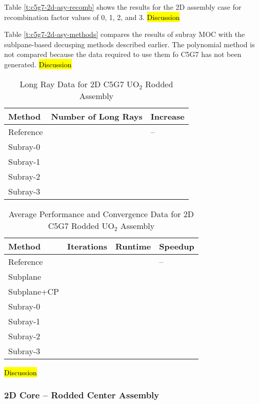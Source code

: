 Table \ref{t:c5g7-2d-asy-recomb} shows the results for the 2D assembly case for recombination factor values of 0, 1, 2, and 3. \hl{Discussion}

Table \ref{t:c5g7-2d-asy-methods} compares the results of subray MOC with the sublpane-based decusping methods described earlier.  The polynomial method is not compared because the data required to use them fo C5G7 has not been generated. \hl{Discussion}

\begin{table}[h]
    \centering
    \caption{Long Ray Data for 2D C5G7 UO\texorpdfstring{$_2$}{2} Rodded Assembly}\label{t:subray-data-2dassembly}
    \begin{tabular}{l l l}\toprule
        Method & Number of Long Rays & Increase \\\midrule
        Reference &  & -- \\
        Subray-0 &  &  \\
        Subray-1 &  &  \\
        Subray-2 &  &  \\
        Subray-3 &  &  \\
        \bottomrule
    \end{tabular}
\end{table}

\begin{table}[h]
    \centering
    \caption{Average Performance and Convergence Data for 2D C5G7 Rodded UO\texorpdfstring{$_2$}{2} Assembly}\label{t:subray-performance-2dassembly}
    \begin{tabular}{l l l l}\toprule
        Method & Iterations & Runtime & Speedup \\\midrule
        Reference &  &  & -- \\
        Subplane &  &  &  \\
        Subplane+CP &  &  &  \\
        Subray-0 &  &  &  \\
        Subray-1 &  &  &  \\
        Subray-2 &  &  &  \\
        Subray-3 &  &  &  \\
        \bottomrule
    \end{tabular}
\end{table}

\hl{Discussion}

\subsubsection{2D Core -- Rodded Center Assembly}

